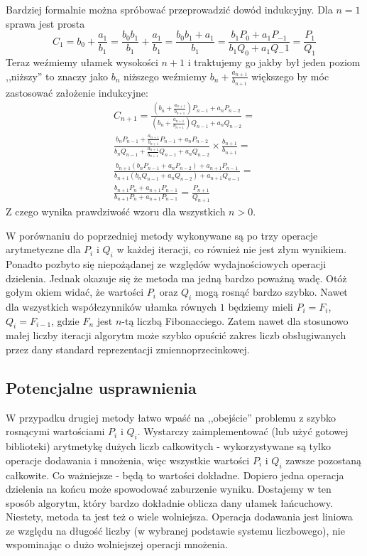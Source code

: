 \documentclass[11pt,leqno]{article}
\begin{document}
Bardziej formalnie można spróbować przeprowadzić dowód indukcyjny. Dla $n = 1$ sprawa jest prosta
\[
C_1 = b_0 + \frac{a_1}{b_1} = \frac{b_0 b_1}{b_1} + \frac{a_1}{b_1} =
\frac{b_0 b_1 + a_1}{b_1} = \frac{b_1 P_0 + a_1 P_{-1}}{b_1 Q_0 + a_1 Q{_-1}} =
\frac{P_1}{Q_1}
\]
Teraz weźmiemy ułamek wysokości $n + 1$ i traktujemy go jakby był jeden poziom ,,niższy'' to znaczy jako $b_n$ niższego weźmiemy $b_n + \frac{a_{n + 1}}{b_{n + 1}}$ większego by móc zastosować założenie indukcyjne:
\[
\begin{split}
C_{n + 1} =
  \frac
    {(b_n + \frac{a_{n + 1}}{b_{n + 1}}) P_{n - 1} + a_n P_{n - 2}}
    {(b_n + \frac{a_{n + 1}}{b_{n + 1}}) Q_{n - 1} + a_n Q_{n - 2}}
  =\\
  \frac
    {b_n P_{n - 1} + \frac{a_{n + 1}}{b_{n + 1}} P_{n - 1} + a_n P_{n - 2}}
    {b_n Q_{n - 1} + \frac{a_{n + 1}}{b_{n + 1}} Q_{n - 1} + a_n Q_{n - 2}}
  \times
  \frac{b_{n + 1}}{b_{n + 1}}
  =\\
  \frac
    {b_{n + 1} (b_n P_{n - 1} + a_n P_{n - 2}) + a_{n + 1} P_{n - 1}}
    {b_{n + 1} (b_n Q_{n - 1} + a_n Q_{n - 2}) + a_{n + 1} Q_{n - 1}}
  =\\
  \frac
    {b_{n + 1} P_n + a_{n + 1} P_{n - 1}}
    {b_{n + 1} P_n + a_{n + 1} P_{n - 1}}
  =
  \frac
    {P_{n + 1}}
    {Q_{n + 1}}  
\end{split}
\]
Z czego wynika prawdziwość wzoru dla wszystkich $n > 0$.

W porównaniu do poprzedniej metody wykonywane są po trzy operacje arytmetyczne dla $P_i$ i $Q_i$ w każdej iteracji, co również nie jest złym wynikiem. Ponadto pozbyto się niepożądanej ze względów wydajnościowych operacji dzielenia. Jednak okazuje się że metoda ma jedną bardzo poważną wadę. Otóż gołym okiem widać, że wartości $P_i$ oraz $Q_i$ mogą rosnąć bardzo szybko. Nawet dla wszystkich współczynników ułamka równych $1$ będziemy mieli $P_i = F_i$, $Q_i = F_{i - 1}$, gdzie $F_n$ jest $n$-tą liczbą Fibonacciego. Zatem nawet dla stosunowo małej liczby iteracji algorytm może szybko opuścić zakres liczb obsługiwanych przez dany standard reprezentacji zmiennoprzecinkowej.

\subsection{Potencjalne usprawnienia}

W przypadku drugiej metody łatwo wpaść na ,,obejście'' problemu z szybko rosnącymi wartościami $P_i$ i $Q_i$. Wystarczy zaimplementować (lub użyć gotowej biblioteki) arytmetykę dużych liczb całkowitych - wykorzystywane są tylko operacje dodawania i mnożenia, więc wszystkie wartości $P_i$ i $Q_i$ zawsze pozostaną całkowite. Co ważniejsze - będą to wartości dokładne. Dopiero jedna operacja dzielenia na końcu może spowodować zaburzenie wyniku. Dostajemy w ten sposób algorytm, który bardzo dokładnie oblicza dany ułamek łańcuchowy. Niestety, metoda ta jest też o wiele wolniejsza. Operacja dodawania jest liniowa ze względu na długość liczby (w wybranej podstawie systemu liczbowego), nie wspominając o dużo wolniejszej operacji mnożenia.
\end{document}
